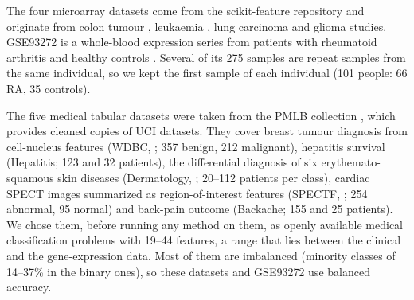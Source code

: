 \documentclass[pdflatex,sn-basic]{sn-jnl}
\begin{document}
The four microarray datasets come from the scikit-feature repository \citep{li2017fs} and originate from colon tumour \citep{alon1999}, leukaemia \citep{golub1999}, lung carcinoma \citep{bhattacharjee2001} and glioma \citep{nutt2003} studies. GSE93272 is a whole-blood expression series from patients with rheumatoid arthritis and healthy controls \citep{tasaki2018}. Several of its 275 samples are repeat samples from the same individual, so we kept the first sample of each individual (101 people: 66 RA, 35 controls).

The five medical tabular datasets were taken from the PMLB collection \citep{olson2017pmlb}, which provides cleaned copies of UCI datasets. They cover breast tumour diagnosis from cell-nucleus features (WDBC, \citealp{street1993}; 357 benign, 212 malignant), hepatitis survival (Hepatitis; 123 and 32 patients), the differential diagnosis of six erythemato-squamous skin diseases (Dermatology, \citealp{guvenir1998}; 20--112 patients per class), cardiac SPECT images summarized as region-of-interest features (SPECTF, \citealp{kurgan2001}; 254 abnormal, 95 normal) and back-pain outcome (Backache; 155 and 25 patients). We chose them, before running any method on them, as openly available medical classification problems with 19--44 features, a range that lies between the clinical and the gene-expression data. Most of them are imbalanced (minority classes of 14--37\% in the binary ones), so these datasets and GSE93272 use balanced accuracy.
\end{document}
